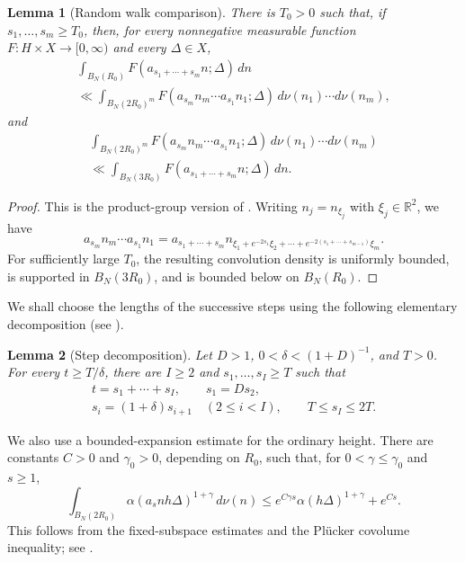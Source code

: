 \documentclass[reqno,11pt]{amsart}
\newtheorem{lem}[lem]{Lemma}
\theoremstyle{definition}
\theoremstyle{remark}
\numberwithin{equation}{section}
\begin{document}
\begin{lem}[Random walk comparison]
\label{lem:randomwalkgeneral}
There is $T_0>0$ such that, if $s_1,\ldots,s_m\ge T_0$, then, for every
nonnegative measurable function $F:H\times X\to[0,\infty)$ and every
$\Delta\in X$,
\begin{multline*}
\int_{B_N(R_0)}
F(a_{s_1+\cdots+s_m}n;\Delta)\,dn\\
\ll
\int_{B_N(2R_0)^m}
F(a_{s_m}n_m\cdots a_{s_1}n_1;\Delta)\,
d\nu(n_1)\cdots d\nu(n_m),
\end{multline*}
and
\begin{multline*}
\int_{B_N(2R_0)^m}
F(a_{s_m}n_m\cdots a_{s_1}n_1;\Delta)\,
d\nu(n_1)\cdots d\nu(n_m)\\
\ll
\int_{B_N(3R_0)}
F(a_{s_1+\cdots+s_m}n;\Delta)\,dn.
\end{multline*}
\end{lem}

\begin{proof}
This is the product-group version of \cite[Lemma~6.1]{Kim}. Writing
$n_j=n_{\xi_j}$ with $\xi_j\in\mathbb R^2$, we have
$$
a_{s_m}n_m\cdots a_{s_1}n_1
=
a_{s_1+\cdots+s_m}
n_{\xi_1+e^{-2s_1}\xi_2+\cdots
+e^{-2(s_1+\cdots+s_{m-1})}\xi_m}.
$$
For sufficiently large $T_0$, the resulting convolution density is
uniformly bounded, is supported in $B_N(3R_0)$, and is bounded below on
$B_N(R_0)$. 
\end{proof}

We shall choose the lengths of the successive steps using the following
elementary decomposition (see \cite[Lemma~6.2]{Kim}).

\begin{lem}[Step decomposition]
\label{lem:ndecomposition}
Let $D>1$, $0<\delta<(1+D)^{-1}$, and $T>0$. For every
$t\ge T/\delta$, there are $I\ge2$ and $s_1,\ldots,s_I\ge T$ such that
$$
\begin{gathered}
t=s_1+\cdots+s_I,\qquad s_1=Ds_2,\\
s_i=(1+\delta)s_{i+1}\quad(2\le i<I),
\qquad
T\le s_I\le2T.
\end{gathered}
$$
\end{lem}


We also use a bounded-expansion estimate for the ordinary height. There are
constants $C>0$ and $\gamma_0>0$, depending on $R_0$, such that, for
$0<\gamma\le\gamma_0$ and $s\geq 1$,
\begin{equation}\label{eq:ordinary-height-small-moment}
\int_{B_N(2R_0)}
\alpha(a_snh\Delta)^{1+\gamma}\,d\nu(n)
\le
e^{C\gamma s}\alpha(h\Delta)^{1+\gamma}
+
e^{Cs}.
\end{equation}
This follows from the fixed-subspace estimates and the Pl\"ucker covolume
inequality; see \cite[Section~5]{eskin-margulis-mozes:1998}.
\end{document}
